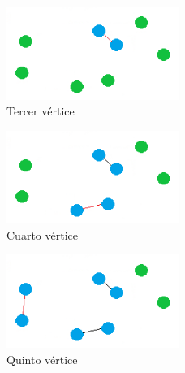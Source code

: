 \begin{frame}
	\begin{exampleblock}{ }
	\begin{figure}[htbH] 
		\centering
		\includegraphics[width=0.5\textwidth]{./Imagenes/arista2.png}
		\caption{Tercer vértice} 
	\end{figure}
	\end{exampleblock}
\end{frame}

\begin{frame}
	\begin{exampleblock}{ }
	\begin{figure}[htbH] 
		\centering
		\includegraphics[width=0.5\textwidth]{./Imagenes/arista3.png}
		\caption{Cuarto vértice} 
	\end{figure}
	\end{exampleblock}
\end{frame}	

\begin{frame}
	\begin{exampleblock}{ }
	\begin{figure}[htbH] 
		\centering
		\includegraphics[width=0.5\textwidth]{./Imagenes/arista4.png}
		\caption{Quinto vértice} 
	\end{figure}
	\end{exampleblock}
\end{frame}

